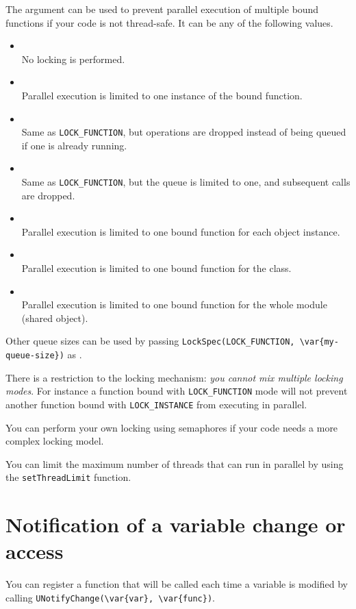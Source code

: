 The  argument can be used to prevent parallel execution of
multiple bound functions if your code is not thread-safe. It can be any of
the following values.
\begin{itemize}
\item {}\\
  No locking is performed.
\item {}\\
  Parallel execution is limited to one instance of the bound function.
\item {}\\
  Same as \lstinline{LOCK_FUNCTION}, but operations are dropped instead of
  being queued if one is already running.
\item {}\\
  Same as \lstinline{LOCK_FUNCTION}, but the queue is limited to one, and
  subsequent calls are dropped.
\item {}\\
  Parallel execution is limited to one bound function for each object
  instance.
\item {}\\
  Parallel execution is limited to one bound function for the class.
\item {}\\
  Parallel execution is limited to one bound function for the whole module
  (shared object).
\end{itemize}

Other queue sizes can be used by passing
\lstinline|LockSpec(LOCK_FUNCTION, \var{my-queue-size})| as .

There is a restriction to the locking mechanism: \emph{you cannot mix
  multiple locking modes}.  For instance a function bound with
\lstinline{LOCK_FUNCTION} mode will not prevent another function bound with
\lstinline{LOCK_INSTANCE} from executing in parallel.

You can perform your own locking using semaphores if your code needs a more
complex locking model.

You can limit the maximum number of threads that can run in parallel by using
the \lstinline{setThreadLimit} function.

\section{Notification of a variable change or access}
\label{sec:uobject:uvar-notify}
You can register a function that will be called each time a variable is
modified by calling \lstinline|UNotifyChange(\var{var}, \var{func})|.

